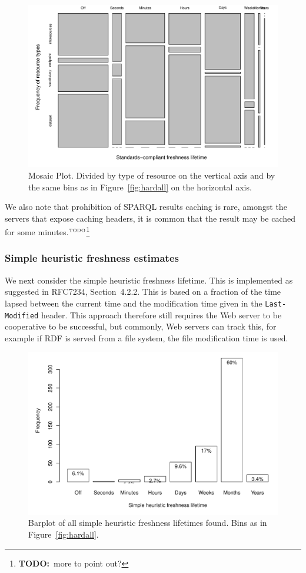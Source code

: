 \documentclass{llncs}
\newcommand{\httph}[1]{\texttt{#1}}
\newcommand{\todo}[1]{\ensuremath{^{\textrm{\tiny{TODO}\normalsize}}}\footnote{\textbf{TODO:}~#1}}
\begin{document}
\begin{figure}[ht]
  \centerline{%
    \includegraphics[width=.9\textwidth]{hardtable.pdf}}
  \caption{Mosaic Plot. Divided by type of resource on the vertical
    axis and by the same bins as in Figure~\ref{fig:hardall} on the
    horizontal axis. }
  \label{fig:hardtable}
\end{figure}


We also note that prohibition of SPARQL results caching is rare,
amongst the servers that expose caching headers, it is common
that the result may be cached for some minutes.\todo{more to point
  out?}

\subsubsection{Simple heuristic freshness estimates}\label{sec:simplefresh}

We next consider the simple heuristic freshness lifetime. This is
implemented as suggested in RFC7234, Section~4.2.2. This is based on a
fraction of the time lapsed between the current time and the
modification time given in the \httph{Last-Modified} header. This
approach therefore still requires the Web server to be cooperative to
be successful, but commonly, Web servers can track this, for example
if RDF is served from a file system, the file modification time is used.


\begin{figure}[th!]
  \centerline{%
    \includegraphics[width=.9\textwidth]{heuristicall.pdf}}
  \caption{Barplot of all simple heuristic freshness lifetimes
    found. Bins as in Figure~\ref{fig:hardall}.}
  \label{fig:heuristicall}
\end{figure}
\end{document}
